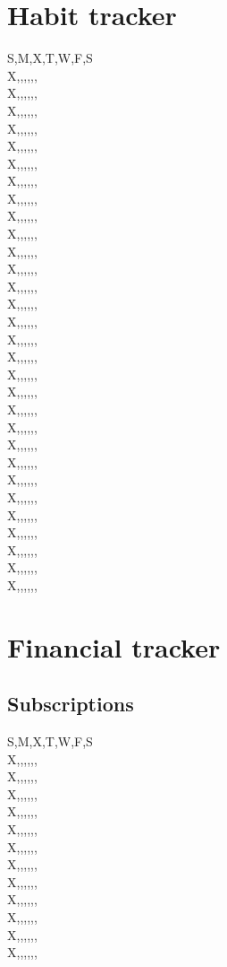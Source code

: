 \documentclass[a4paper]{article}
\begin{document}
\section{Habit tracker}
S,M,X,T,W,F,S\\
X,,,,,,\\
X,,,,,,\\
X,,,,,,\\
X,,,,,,\\
X,,,,,,\\
X,,,,,,\\
X,,,,,,\\
X,,,,,,\\
X,,,,,,\\
X,,,,,,\\
X,,,,,,\\
X,,,,,,\\
X,,,,,,\\
X,,,,,,\\
X,,,,,,\\
X,,,,,,\\
X,,,,,,\\
X,,,,,,\\
X,,,,,,\\
X,,,,,,\\
X,,,,,,\\
X,,,,,,\\
X,,,,,,\\
X,,,,,,\\
X,,,,,,\\
X,,,,,,\\
X,,,,,,\\
X,,,,,,\\
X,,,,,,\\
X,,,,,,\\
\newpage
\section{Financial tracker}
\subsection{Subscriptions}
S,M,X,T,W,F,S\\
X,,,,,,\\
X,,,,,,\\
X,,,,,,\\
X,,,,,,\\
X,,,,,,\\
X,,,,,,\\
X,,,,,,\\
X,,,,,,\\
X,,,,,,\\
X,,,,,,\\
X,,,,,,\\
X,,,,,,\\
\end{document}
